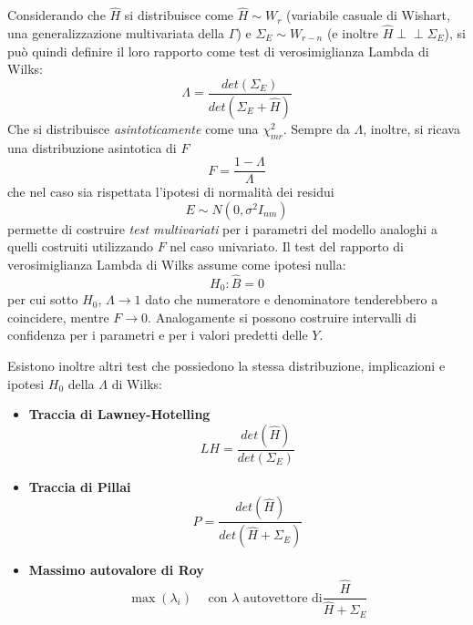 \documentclass[a4page, 11pt]{article} %
\def\indep{\perp \!\!\! \perp }   %
\begin{document}
Considerando che $\hat{H}$ si distribuisce come $\hat{H} \sim W_r$ (variabile casuale di Wishart, una generalizzazione multivariata della $\Gamma$) e $\Sigma_E \sim W_{r - n}$ (e inoltre $\hat{H} \indep \Sigma_E$), si può quindi definire il loro rapporto come test di verosimiglianza Lambda di Wilks:
\begin{equation*}
  \Lambda = \frac{det(\Sigma_E)}{det(\Sigma_E + \hat{H})}
\end{equation*}
Che si distribuisce \textit{asintoticamente} come una $\chi^2_{mr}$.
Sempre da $\Lambda$, inoltre, si ricava una distribuzione asintotica di $F$
\begin{equation*}
F = \frac{1 - \Lambda}{\Lambda}
\end{equation*}
che nel caso sia rispettata l'ipotesi di normalità dei residui
\begin{equation*}
E \sim N(0,\sigma^2 I_{nm})
\end{equation*}
permette di costruire \textit{test multivariati} per i parametri  del modello analoghi a quelli costruiti utilizzando $F$ nel caso univariato.
Il test del rapporto di verosimiglianza Lambda di Wilks assume come ipotesi nulla: 
\begin{equation*}
H_0 : \hat{B} = 0 
\end{equation*} 
per cui sotto $H_0$, $\Lambda \to 1$ dato che numeratore e denominatore tenderebbero a coincidere, mentre $F \to 0$.
Analogamente si possono costruire intervalli di confidenza per i parametri e per i valori predetti delle $Y$.

Esistono inoltre altri test che possiedono la stessa distribuzione, implicazioni e ipotesi $H_0$ della $\Lambda$ di Wilks:
\begin{itemize}[noitemsep]
\item \textbf{Traccia di Lawney-Hotelling}
\begin{equation*}
LH = \frac{det(\hat{H})}{det(\Sigma_E)}
\end{equation*}
\item \textbf{Traccia di Pillai}
\begin{equation*}
P = \frac{det(\hat{H})}{det(\hat{H} + \Sigma_E)}
\end{equation*}
\item \textbf{Massimo autovalore di Roy}
\begin{equation*}
\max(\lambda_i) \hspace{15pt} \text{con $\lambda$ autovettore di} \frac{\hat{H}}{\hat{H} + \Sigma_E}
\end{equation*}
\end{itemize}
\end{document}
